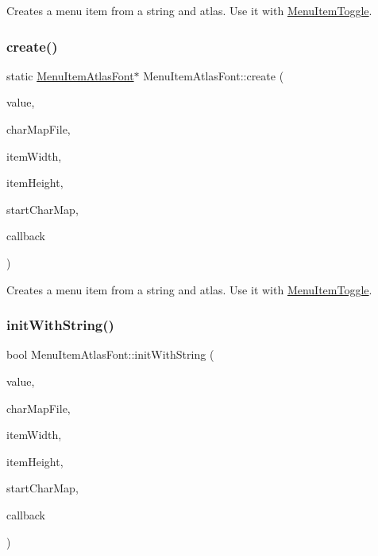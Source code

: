 Creates a menu item from a string and atlas. Use it with \hyperlink{classMenuItemToggle}{Menu\+Item\+Toggle}. \mbox{\label{classMenuItemAtlasFont_ac8631e49e25f7eaa6fc207137c38075c}} 
\subsubsection{\texorpdfstring{create()}{create()}\hspace{0.1cm}{\footnotesize\ttfamily [6/6]}}
{\footnotesize\ttfamily static \hyperlink{classMenuItemAtlasFont}{Menu\+Item\+Atlas\+Font}$\ast$ Menu\+Item\+Atlas\+Font\+::create (\begin{DoxyParamCaption}\item[{const std\+::string \&}]{value,  }\item[{const std\+::string \&}]{char\+Map\+File,  }\item[{int}]{item\+Width,  }\item[{int}]{item\+Height,  }\item[{char}]{start\+Char\+Map,  }\item[{const cc\+Menu\+Callback \&}]{callback }\end{DoxyParamCaption})\hspace{0.3cm}{\ttfamily [static]}}

Creates a menu item from a string and atlas. Use it with \hyperlink{classMenuItemToggle}{Menu\+Item\+Toggle}. \mbox{\label{classMenuItemAtlasFont_a72356ec71430cdd8b632e28bd8ec47d5}} 
\subsubsection{\texorpdfstring{init\+With\+String()}{initWithString()}\hspace{0.1cm}{\footnotesize\ttfamily [1/2]}}
{\footnotesize\ttfamily bool Menu\+Item\+Atlas\+Font\+::init\+With\+String (\begin{DoxyParamCaption}\item[{const std\+::string \&}]{value,  }\item[{const std\+::string \&}]{char\+Map\+File,  }\item[{int}]{item\+Width,  }\item[{int}]{item\+Height,  }\item[{char}]{start\+Char\+Map,  }\item[{const cc\+Menu\+Callback \&}]{callback }\end{DoxyParamCaption})}

